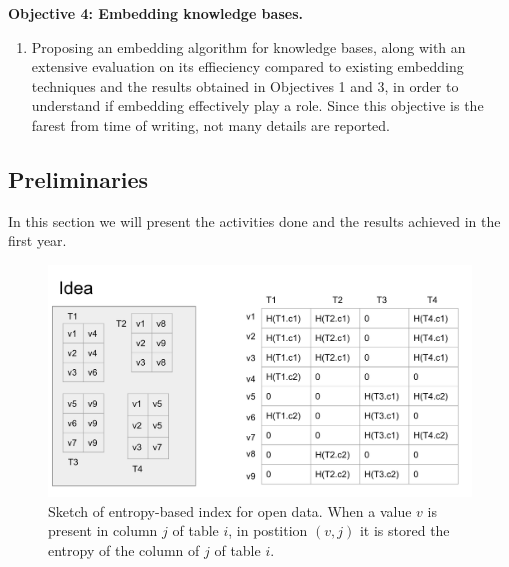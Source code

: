 \noindent\textbf{Objective 4: Embedding knowledge bases.}
\begin{enumerate}
    \item Proposing an embedding algorithm for knowledge bases, along with an extensive evaluation on its effieciency compared to existing embedding techniques and the results obtained in Objectives 1 and 3, in order to understand if embedding effectively play a role. Since this objective is the farest from time of writing, not many details are reported.
\end{enumerate}






\subsection{Preliminaries}\label{sub_preliminaries}
In this section we will present the activities done and the results achieved in the first year.

\begin{figure}[t]\label{index_sketch}
    \includegraphics[scale=0.4]{figures/index_sketch.png}
    \caption{Sketch of entropy-based index for open data. When a value $v$ is present in column $j$ of table $i$, in postition $(v,j)$ it is stored the entropy of the column of $j$ of table $i$.}
\end{figure}

